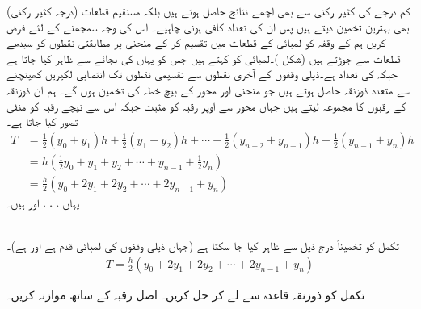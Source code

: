 کم درجے کی کثیر رکنی سے بھی اچھے نتائج حاصل ہوتے ہیں بلکہ مستقیم قطعات (درجہ  کثیر رکنی) بھی بہترین تخمین دیتے ہیں پس ان کی تعداد کافی ہونی چاہیے۔ اس کی وجہ سمجھنے کے لئے فرض کریں ہم  کے وقفہ  کو  لمبائی کے  قطعات میں تقسیم کر کے منحنی پر مطابقتی نقطوں کو سیدھے قطعات سے جوڑتے ہیں (شکل )۔لمبائی  کو  کہتے ہیں جس کو یہاں  کی بجائے  سے ظاہر کیا جاتا ہے جبکہ   کی تعداد ہے۔ذیلی وقفوں کے آخری نقطوں سے تقسیمی نقطوں تک انتصابی لکیریں کھینچنے سے متعدد  ذوزنقہ حاصل ہوتے  ہیں جو منحنی اور  محور کے بیچ خطہ کی تخمین ہوں گے۔ ہم ان ذوزنقہ کے رقبوں کا مجموعہ لیتے ہیں جہاں محور سے اوپر رقبہ کو مثبت جبکہ اس سے نیچے رقبہ کو منفی تصور کیا جاتا ہے۔
\begin{align*}
T&=\frac{1}{2}(y_0+y_1)h+\frac{1}{2}(y_1+y_2)h+\cdots+\frac{1}{2}(y_{n-2}+y_{n-1})h+\frac{1}{2}(y_{n-1}+y_n)h\\
&=h(\frac{1}{2}y_0+y_1+y_2+\cdots+y_{n-1}+\frac{1}{2}y_n)\\
&=\frac{h}{2}(y_0+2y_1+2y_2+\cdots+2y_{n-1}+y_n)
\end{align*}
یہاں  ، ، ،  اور  ہیں۔

\\
تکمل  کو تخمیناً درج ذیل سے ظاہر کیا جا سکتا ہے (جہاں  ذیلی وقفوں کی لمبائی قدم  ہے اور  ہے)۔
\begin{align}\label{مساوات_تکمل_ذوزنقہ_قاعدہ}
T=\frac{h}{2}(y_0+2y_1+2y_2+\cdots+2y_{n-1}+y_n)
\end{align}

تکمل کو ذوزنقہ قاعدہ سے  لے کر حل کریں۔ اصل رقبہ کے ساتھ موازنہ کریں۔

